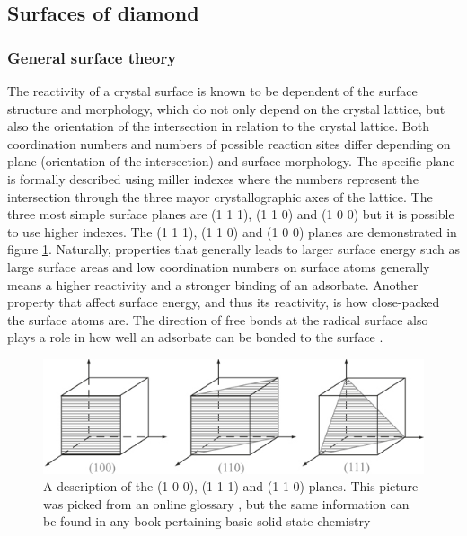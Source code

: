 \documentclass[10pt,a4paper]{article}
\begin{document}
\subsection{Surfaces of diamond}
\subsubsection{General surface theory}
The reactivity of a crystal surface is known to be dependent of the surface structure and morphology, which do not only depend on the crystal lattice, but also the orientation of the intersection in relation to the crystal lattice. Both coordination numbers and numbers of possible reaction sites differ depending on plane (orientation of the intersection) and surface morphology. The specific plane is formally described using miller indexes where the numbers represent the intersection through the three mayor crystallographic axes of the lattice. The three most simple surface planes are (1 1 1), (1 1 0) and (1 0 0) but it is possible to use higher indexes. The (1 1 1), (1 1 0) and (1 0 0) planes are demonstrated in figure \ref{millerindex}. Naturally, properties that generally leads to larger surface energy such as large surface areas and low coordination numbers on surface atoms generally means a higher reactivity and a stronger binding of an adsorbate. Another property that affect surface energy, and thus its reactivity, is how close-packed the surface atoms are. The direction of free bonds at the radical surface also plays a role in how well an adsorbate can be bonded to the surface \cites{surfaces, BAHC}. 

\begin{figure} \captionsetup{width=.8\linewidth}
\caption{A description of the  (1 0 0), (1 1 1) and (1 1 0) planes. This picture was picked from an online glossary \cite{millerindex}, but the same information can be found in any book pertaining basic solid state chemistry} \label{millerindex}
%
\includegraphics[width=.8\linewidth]{pictures/millerindex.png}
\end{figure}
\end{document}
